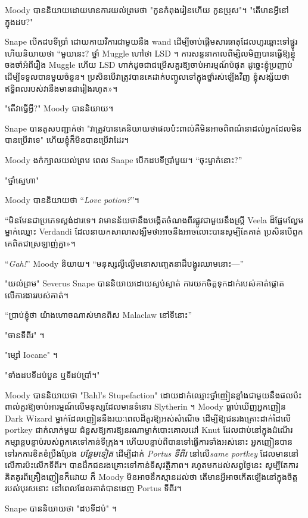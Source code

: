 {{{{{{Moody បាននិយាយដោយមានការយល់ព្រមថា "កូនកំពុងរៀនហើយ កូនប្រុស"។ "តើមានអ្វីនៅក្នុងដប?"

Snape បើកដបទីប្រាំ ដោយកាយវិការជាមួយនឹង wand ដើម្បីចាប់ផ្តើមសារធាតុដែលហូរឆ្ពោះទៅផ្នូរ ហើយនិយាយថា “មួយនេះ? ថ្នាំ Muggle ហៅថា LSD ។ ការសន្ទនាកាលពីម្សិលមិញបានធ្វើឱ្យខ្ញុំចងចាំអំពីរឿង Muggle ហើយ LSD ហាក់ដូចជាជម្រើសគួរឱ្យចាប់អារម្មណ៍បំផុត ដូច្នេះខ្ញុំប្រញាប់ដើម្បីទទួលបានមួយចំនួន។ ប្រសិន​បើ​វា​ត្រូវ​បាន​គេ​ដាក់​បញ្ចូល​ទៅ​ក្នុង​ថ្នាំ​រស់​ឡើង​វិញ ខ្ញុំ​សង្ស័យ​ថា​ឥទ្ធិពល​របស់​វា​នឹង​មាន​ជា​រៀង​រហូត»។

"តើវាធ្វើអ្វី?" Moody បាននិយាយ។

Snape បានគូសបញ្ជាក់ថា "វាត្រូវបានគេនិយាយថាផលប៉ះពាល់គឺមិនអាចពិពណ៌នាដល់អ្នកដែលមិនបានប្រើវាទេ" ហើយខ្ញុំក៏មិនបានប្រើវាដែរ។

Moody ងក់ក្បាលយល់ព្រម ពេល Snape បើកដបទីប្រាំមួយ។ “ចុះម្នាក់នោះ?”

"ថ្នាំស្នេហា"

Moody បាននិយាយថា “\emph{Love potion?}”។

“មិន​មែន​ជា​ប្រភេទ​ស្តង់ដារ​ទេ។ វា​មាន​ន័យ​ថា​នឹង​បង្កើត​ចំណង​ពីរ​ផ្លូវ​ជាមួយ​នឹង​ស្ត្រី Veela ដ៏​ផ្អែមល្ហែម​ម្នាក់​ឈ្មោះ Verdandi ដែល​នាយក​សាលា​សង្ឃឹម​ថា​អាច​នឹង​អាច​លោះ​បាន​សូម្បី​តែ​គាត់ ប្រសិន​បើ​ពួក​គេ​ពិត​ជា​ស្រឡាញ់​គ្នា»។

“\emph{Gah!}” Moody និយាយ។ “មនុស្សល្ងីល្ងើមនោសញ្ចេតនាដ៏បង្ហូរឈាមនោះ—”

"យល់ព្រម" Severus Snape បាននិយាយដោយស្ងប់ស្ងាត់ ការយកចិត្តទុកដាក់របស់គាត់ផ្តោតលើការងាររបស់គាត់។

“ប្រាប់ខ្ញុំថា យ៉ាងហោចណាស់មានពិស Malaclaw នៅទីនោះ”

"ចានទីពីរ" ។

"ម្សៅ Iocane" ។

"ទាំងដបទីដប់បួន ឬទីដប់ប្រាំ។"

Moody បាននិយាយថា "Bahl's Stupefaction" ដោយដាក់ឈ្មោះថ្នាំញៀនខ្លាំងជាមួយនឹងផលប៉ះពាល់គួរឱ្យចាប់អារម្មណ៍លើមនុស្សដែលមានទំនោរ Slytherin ។ Moody ធ្លាប់ឃើញអ្នកញៀន Dark Wizard ម្នាក់ដែលញៀននឹងរយៈពេលដ៏គួរឱ្យអស់សំណើច ដើម្បីឱ្យជនរងគ្រោះដាក់ដៃលើ portkey ជាក់លាក់មួយ ជំនួសឱ្យការឱ្យនរណាម្នាក់បោះគោលដៅ Knut ដែលជាប់នៅក្នុងដំណើរកម្សាន្តបន្ទាប់របស់ពួកគេទៅកាន់ទីក្រុង។ ហើយបន្ទាប់ពីបានទៅធ្វើការទាំងអស់នោះ អ្នកញៀនបានទៅរកការខិតខំប្រឹងប្រែង \emph{បន្ថែមទៀត} ដើម្បីដាក់\emph{ Portus ទីពីរ} នៅលើ\emph{same portkey} ដែលមាននៅលើការប៉ះលើកទីពីរ។ បាន​ដឹក​ជន​រង​គ្រោះ​ទៅ​កាន់​ទី​សុវត្ថិភាព។ រហូតមកដល់សព្វថ្ងៃនេះ សូម្បីតែការគិតគូរពីគ្រឿងញៀនក៏ដោយ ក៏ Moody មិនអាចនឹកស្មានដល់ថា តើមានអ្វីអាចកើតឡើងនៅក្នុងចិត្តរបស់បុរសនោះ នៅពេលដែលគាត់បានដេញ Portus ទីពីរ។

Snape បាននិយាយថា "ដបទីដប់" ។

}}}}}}
